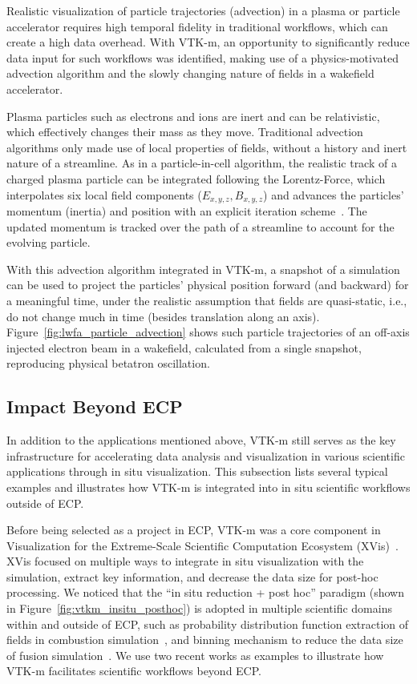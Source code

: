 Realistic visualization of particle trajectories (advection) in a plasma or particle accelerator requires high temporal fidelity in traditional workflows, which can create a high data overhead.
With VTK-m, an opportunity to significantly reduce data input for such workflows was identified, making use of a physics-motivated advection algorithm and the slowly changing nature of fields in a wakefield accelerator.

Plasma particles such as electrons and ions are inert and can be relativistic, which effectively changes their mass as they move.
Traditional advection algorithms only made use of local properties of fields, without a history and inert nature of a streamline.
As in a particle-in-cell algorithm, the realistic track of a charged plasma particle can be integrated following the Lorentz-Force, which interpolates six local field components ($E_{x,y,z}, B_{x,y,z}$) and advances the particles' momentum (inertia) and position with an explicit iteration scheme~\cite{Boris1970}.
The updated momentum is tracked over the path of a streamline to account for the evolving particle.

With this advection algorithm integrated in VTK-m, a snapshot of a simulation can be used to project the particles' physical position forward (and backward) for a meaningful time, under the realistic assumption that fields are quasi-static, i.e., do not change much in time (besides translation along an axis).
Figure~\ref{fig:lwfa_particle_advection} shows such particle trajectories of an off-axis injected electron beam in a wakefield, calculated from a single snapshot, reproducing physical betatron oscillation.

\subsection{Impact Beyond ECP}


In addition to the applications mentioned above, VTK-m still serves as the key infrastructure for accelerating data analysis and visualization in various scientific applications through in situ visualization. This subsection lists several typical examples and illustrates how VTK-m is integrated into in situ scientific workflows outside of ECP.


Before being selected as a project in ECP, VTK-m was a core component in Visualization for the Extreme-Scale Scientific Computation Ecosystem (XVis)~\cite{Moreland2019}. 
XVis focused on multiple ways to integrate in situ visualization with the simulation, extract key information, and decrease the data size for post-hoc processing. We noticed that 
the ``in situ reduction + post hoc'' paradigm (shown in Figure~\ref{fig:vtkm_insitu_posthoc}) is adopted in multiple scientific domains within and outside of ECP, such as probability distribution function extraction of fields in combustion simulation~\cite{Ye2016}, and binning mechanism to reduce the data size of fusion simulation~\cite{Kress2018}. We use two recent works as examples to illustrate how VTK-m facilitates scientific workflows beyond ECP.

